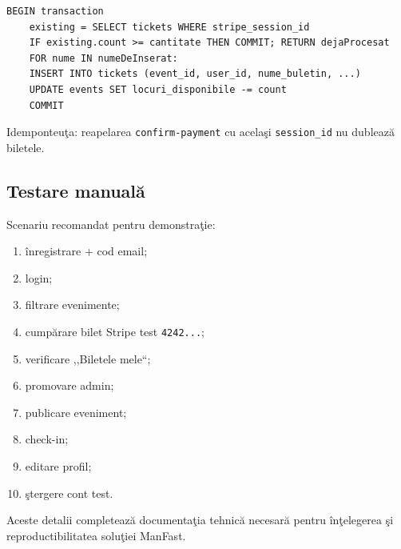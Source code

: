 \begin{lstlisting}[mathescape=true]
	BEGIN transaction
	existing = SELECT tickets WHERE stripe_session_id
	IF existing.count >= cantitate THEN COMMIT; RETURN dejaProcesat
	FOR nume IN numeDeInserat:
	INSERT INTO tickets (event_id, user_id, nume_buletin, ...)
	UPDATE events SET locuri_disponibile -= count
	COMMIT
\end{lstlisting}

\noindent Idemponteu\c ta: reapelarea \texttt{confirm-payment} cu acela\c si \texttt{session\_id} nu dubleaz\u a \linebreak biletele.


\subsection{Testare manual\u a}

Scenariu recomandat pentru demonstra\c tie:
\begin{enumerate}
	\item \^inregistrare + cod email;
	\item login;
	\item filtrare evenimente;
	\item cump\u arare bilet Stripe test \texttt{4242...};
	\item verificare ,,Biletele mele``;
	\item promovare admin;
	\item publicare eveniment;
	\item check-in;
	\item editare profil;
	\item \c stergere cont test.
\end{enumerate}

Aceste detalii completeaz\u a documenta\c tia tehnic\u a necesar\u a pentru \^in\c telegerea \c si reproductibilitatea solu\c tiei ManFast.